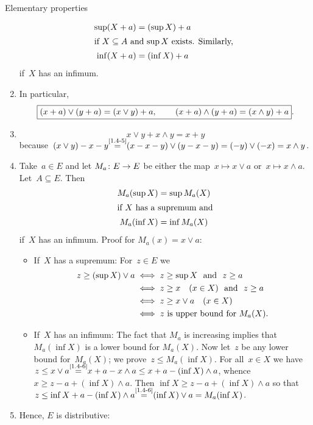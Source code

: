 \documentclass[main.tex]{subfiles}
\begin{document}
\begin{psec}{Elementary properties}
\begin{enumerate}
\begin{align*}
\sup(X+a) &= (\sup X) + a \\
\intertext{%
if $X\subseteq A$ and $\sup X$ exists.
Similarly, }
\inf (X+a) &= (\inf X)+a
\end{align*}
if~$X$ has an infimum.
\item %
\label{1.4-5}
In particular,
\begin{equation*}
\label{i1.4-5}
\frmd{%
(x+a)\vee   (y+a)=(x\vee y)+a
\htam{, } \qquad 
(x+a)\wedge (y+a)=(x\wedge y)+a }
\htam{.}
\end{equation*}
\item %
\label{1.4-6}
\begin{equation*}
x\vee y + x\wedge y = x+y
\end{equation*}
because~$(x\vee y)-x-y 
\isref{1.4-5}
(x-x-y)\vee(y-x-y)=(-y)\vee(-x)=x\wedge y$.
\item %
\label{1.4-7}
Take~$a\in E$ and let $M_a\colon E\rightarrow E$ 
be either the map~$x\mapsto x\vee a$
or~$x\mapsto x\wedge a$. 
Let~$A\subseteq E$.
Then
\begin{align*}
M_a(\sup X) &= \sup M_a(X) \\
\intertext{%
if $X$ has a supremum and}
M_a(\inf X) &= \inf M_a(X)
\end{align*}
if~$X$ has an infimum.
Proof for $M_a(x)=x\vee a$:
\begin{itemize}
\item %
If~$X$ has a supremum:  
For~$z\in E$ we
\begin{align*}
z\ge (\sup X)\vee a  
  & \iff z\ge \sup X\ \textnormal{ and }\  z\ge a \\
  & \iff z\ge x\quad (x\in X)\ \textnormal{ and }\  z\ge a\\
  & \iff z\ge x\vee a\quad (x\in X) \\
  & \iff z\textnormal{ is upper bound for }M_a(X)\textnormal{.}
\end{align*}
\item %
If~$X$ has an infimum: 
The fact that $M_a$ is increasing 
implies that $M_a(\inf X)$ is a lower bound
for $M_a(X)$.
Now let~$z$
be any lower bound for~$M_a(X)$;
we prove~$z\leq M_a(\inf X)$.
For all~$x\in X$
we have
$z\leq x\vee a 
\isref{1.4-6}
x+a - x\wedge a
\leq x+a-(\inf X)\wedge a$,
whence
$x\ge z-a+(\inf X)\wedge a$.
Then $\inf X\geq z-a+(\inf X)\wedge a$
so that 
$z\leq \inf X +a - (\inf X)\wedge a
\isref{1.4-6}
(\inf X)\vee a = M_a(\inf X)$.
\end{itemize}
\item %
\label{1.4-8}
Hence, $E$ is distributive:
\begin{equation*}

\end{equation*}
\end{enumerate}
\end{psec}
\end{document}
